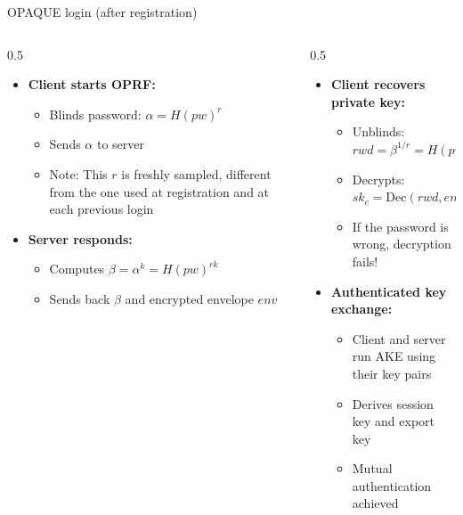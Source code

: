 \ifdefined\PRESENTATION\else\PassOptionsToClass{handout}{beamer}\fi\documentclass[aspectratio=169, lualatex]{beamer}
\begin{document}
\begin{frame}{OPAQUE login (after registration)}
	\begin{columns}[c]
		\begin{column}{0.5\textwidth}
			\begin{itemize}
				\item[1.]\textbf{Client starts OPRF:}
				      \begin{itemize}
					      \item Blinds password: $\alpha = H(pw)^r$
					      \item Sends $\alpha$ to server
					      \item Note: This $r$ is freshly sampled, different from the one used at registration and at each previous login
				      \end{itemize}
				\item[2.]\textbf{Server responds:}
				      \begin{itemize}
					      \item Computes $\beta = \alpha^k = H(pw)^{rk}$
					      \item Sends back $\beta$ and encrypted envelope $env$
				      \end{itemize}
			\end{itemize}
		\end{column}
		\begin{column}{0.5\textwidth}
			\begin{itemize}
				\item[3.]\textbf{Client recovers private key:}
				      \begin{itemize}
					      \item Unblinds: $rwd = \beta^{1/r} = H(pw)^k$
					      \item Decrypts: $sk_c = \text{Dec}(rwd, env)$
					      \item If the password is wrong, decryption fails!
				      \end{itemize}
				\item[4.]\textbf{Authenticated key exchange:}
				      \begin{itemize}
					      \item Client and server run AKE using their key pairs
					      \item Derives session key and export key
					      \item Mutual authentication achieved
				      \end{itemize}
			\end{itemize}
		\end{column}
	\end{columns}
\end{frame}
\end{document}
